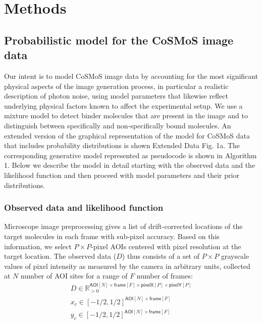 \section*{Methods}

\subsection*{Probabilistic model for the CoSMoS image data} 

Our intent is to model CoSMoS image data by accounting for the most significant physical aspects of the image generation process, in particular a realistic description of photon noise, using model parameters that likewise reflect underlying physical factors known to affect the experimental setup. We use a mixture model to detect binder molecules that are present in the image and to distinguish between specifically and non-specifically bound molecules. An extended version of the graphical representation of the model for CoSMoS data that includes probability distributions is shown Extended Data Fig. 1a. The corresponding generative model represented as pseudocode is shown in Algorithm 1. Below we describe the model in detail starting with the observed data and the likelihood function and then proceed with model parameters and their prior distributions.

\subsubsection*{Observed data and likelihood function}

Microscope image preprocessing gives a list of drift-corrected locations of the target molecules in each frame with sub-pixel accuracy. Based on this information, we select $P \times P$-pixel AOIs centered with pixel resolution at the target location. The observed data ($D$) thus consists of a set of $P \times P$ grayscale values of pixel intensity as measured by the camera in arbitrary units, collected at $N$ number of AOI sites for a range of $F$ number of frames:
%
\begin{gather*}
    D \in \mathbb{R}_{>0}^{\mathsf{AOI}[N] \times \mathsf{frame}[F] \times \mathsf{pixelX}[P] \times \mathsf{pixelY}[P]} \\
    x_c \in [-1/2, 1/2]^{\mathsf{AOI}[N] \times \mathsf{frame}[F]} \\
    y_c \in [-1/2, 1/2]^{\mathsf{AOI}[N] \times \mathsf{frame}[F]} \\
\end{gather*}

